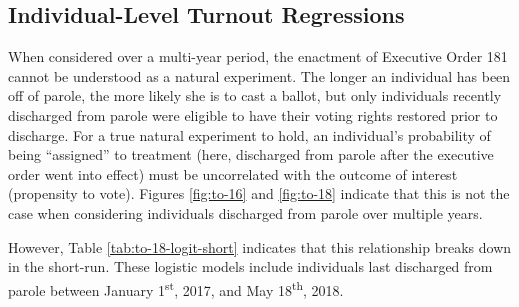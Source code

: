 \documentclass[
  12pt,
]{article}
\begin{document}
\hypertarget{individual-level-turnout-regressions}{%
\subsection*{Individual-Level Turnout Regressions}\label{individual-level-turnout-regressions}}

When considered over a multi-year period, the enactment of Executive Order 181 cannot be understood as a natural experiment. The longer an individual has been off of parole, the more likely she is to cast a ballot, but only individuals recently discharged from parole were eligible to have their voting rights restored prior to discharge. For a true natural experiment to hold, an individual's probability of being ``assigned'' to treatment (here, discharged from parole after the executive order went into effect) must be uncorrelated with the outcome of interest (propensity to vote). Figures \ref{fig:to-16} and \ref{fig:to-18} indicate that this is not the case when considering individuals discharged from parole over multiple years.

However, Table \ref{tab:to-18-logit-short} indicates that this relationship breaks down in the short-run. These logistic models include individuals last discharged from parole between January 1\textsuperscript{st}, 2017, and May 18\textsuperscript{th}, 2018.
\end{document}
